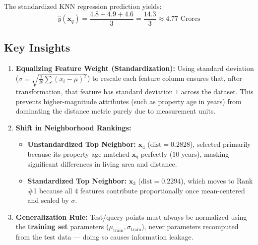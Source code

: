 \documentclass[12pt]{article}
\newcommand{\MVec}[1]{\mathbf{#1}}
\begin{document}
The standardized KNN regression prediction yields:
\[
    \hat{y}(\MVec{x}_q) = \frac{4.8 + 4.9 + 4.6}{3} = \frac{14.3}{3} \approx 4.77 \text{ Crores}
\]

\subsection*{Key Insights}

\begin{tcolorbox}[colback=blue!5!white,colframe=blue!75!black,title=Classroom Takeaways: Why Feature Scaling Matters]
\begin{enumerate}
    \item \textbf{Equalizing Feature Weight (Standardization):} Using standard deviation ($\sigma = \sqrt{\frac{1}{N}\sum(x_i - \mu)^2}$) to rescale each feature column ensures that, after transformation, that feature has standard deviation $1$ across the dataset. This prevents higher-magnitude attributes (such as property age in years) from dominating the distance metric purely due to measurement units.
    \item \textbf{Shift in Neighborhood Rankings:}
          \begin{itemize}
              \item \textbf{Unstandardized Top Neighbor:} $\MVec{x}_4$ ($\text{dist} = 0.2828$), selected primarily because its property age matched $\MVec{x}_q$ perfectly ($10$ years), masking significant differences in living area and distance.
              \item \textbf{Standardized Top Neighbor:} $\MVec{x}_3$ ($\text{dist} = 0.2294$), which moves to Rank \#1 because all $4$ features contribute proportionally once mean-centered and scaled by $\sigma$.
          \end{itemize}
    \item \textbf{Generalization Rule:} Test/query points must always be normalized using the \textbf{training set} parameters ($\mu_{\text{train}}, \sigma_{\text{train}}$), never parameters recomputed from the test data — doing so causes information leakage.
\end{enumerate}
\end{tcolorbox}
\end{document}
